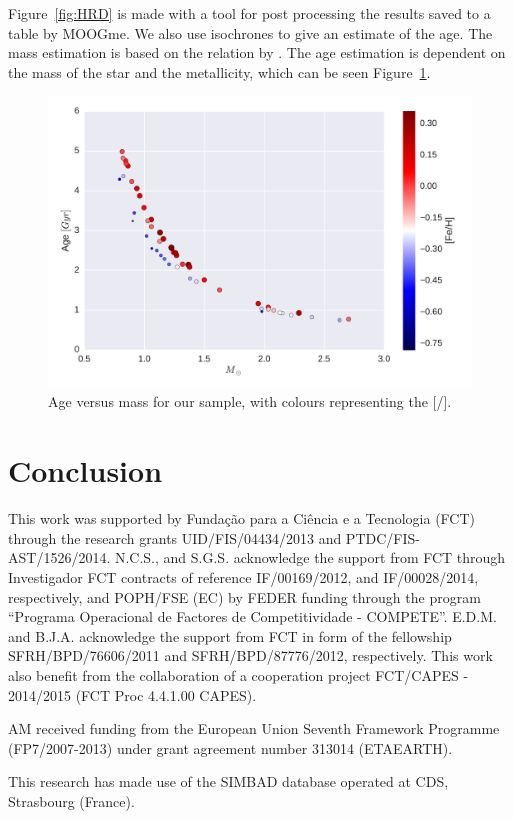 \documentclass{aa}
\begin{document}
Figure~\ref{fig:HRD} is made with a tool for post processing the results
saved to a table by MOOGme. We also use isochrones \citep{Morton2015}
to give an estimate of the age. The mass estimation is based on the relation
by \citet{Torres2010}. The age estimation is dependent on the mass of the
star and the metallicity, which can be seen Figure~\ref{fig:age}.

\begin{figure}[tpb]
    \centering
    \includegraphics[width=1.0\linewidth]{figures/mass_age_feh.pdf}
    \caption{Age versus mass for our sample, with colours representing the
    [/].}
    \label{fig:age}
\end{figure}



\section{Conclusion}
\label{sec:conclusion}




\begin{acknowledgements}

This work was supported by Funda\c{c}\~ao para a Ci\^encia e a
Tecnologia (FCT) through the research grants UID/FIS/04434/2013 and
PTDC/FIS-AST/1526/2014. N.C.S., and S.G.S. acknowledge the support from
FCT through Investigador FCT contracts of reference IF/00169/2012, and
IF/00028/2014, respectively, and POPH/FSE (EC) by FEDER funding through
the program “Programa Operacional de Factores de Competitividade
- COMPETE”. E.D.M. and B.J.A. acknowledge the support from FCT in
form of the fellowship SFRH/BPD/76606/2011 and SFRH/BPD/87776/2012,
respectively. This work also benefit from the collaboration of a
cooperation project FCT/CAPES - 2014/2015 (FCT Proc 4.4.1.00 CAPES).

AM received funding from the European Union Seventh Framework Programme
(FP7/2007-2013) under grant agreement number 313014 (ETAEARTH).


This research has made use of the SIMBAD database operated at CDS,
Strasbourg (France).

\end{acknowledgements}




\end{document}
